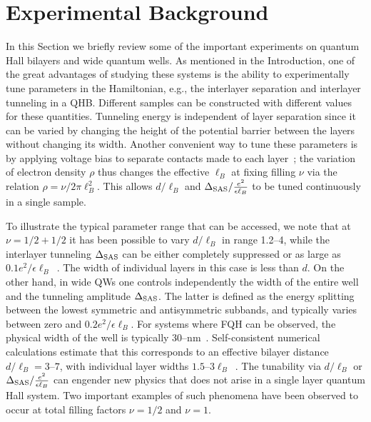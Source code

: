 \section{Experimental Background}
\label{sec:ex_back}

In this Section we briefly review some of the important experiments on quantum Hall bilayers and wide quantum wells. 
As mentioned in the Introduction, one of the great advantages of studying these systems is the ability to experimentally tune parameters in the Hamiltonian, e.g., the interlayer separation and interlayer tunneling in a QHB.
Different samples can be constructed with different values for these quantities.
Tunneling energy is independent of layer separation since it can be varied by changing the height of the potential barrier between the layers without changing its width.
Another convenient way to tune these parameters is by applying voltage bias to separate contacts made to each layer~\cite{EisensteinSeparateContacts}; the variation of electron density $\rho$ thus changes the effective $\ell_B$ at fixing filling $\nu$ via the relation $\rho=\nu/2\pi\ell_B^2$.
This allows $d/\ell_B$ and $\Delta_\textrm{SAS}/\frac{e^2}{\epsilon\ell_B}$ to be tuned continuously in a single sample. 

To illustrate the typical parameter range that can be accessed, we note that at $\nu=1/2+1/2$ it has been possible to vary $d/\ell_B$ in range 1.2\mbox{--}4, while the interlayer tunneling $\Delta_\textrm{SAS}$ can be either completely suppressed or as large as $0.1e^2/\epsilon\ell_B$~\cite{JimReview}.
The width of individual layers in this case is less than $d$. 
On the other hand, in wide QWs one controls independently the width of the entire well and the tunneling amplitude $\Delta_\textrm{SAS}$. 
The latter is defined as the energy splitting between the lowest symmetric and antisymmetric subbands, and typically varies between zero and $0.2e^2/\epsilon\ell_B$.
For systems where FQH can be observed, the physical width of the well is typically 30--\unit[65]{nm}~\cite{Shabani13}. 
Self-consistent numerical calculations estimate that this corresponds to an effective bilayer distance $d/\ell_B=3\mbox{--}7$, with individual layer widths $1.5\mbox{--}3\ell_B$~\cite{Shabani13}.    
The tunability via $d/\ell_B$ or $\Delta_\textrm{SAS}/\frac{e^2}{\epsilon\ell_B}$ can engender new physics that does not arise in a single layer quantum Hall system.
Two important examples of such phenomena have been observed to occur at total filling factors $\nu=1/2$ and $\nu=1$.  
   
